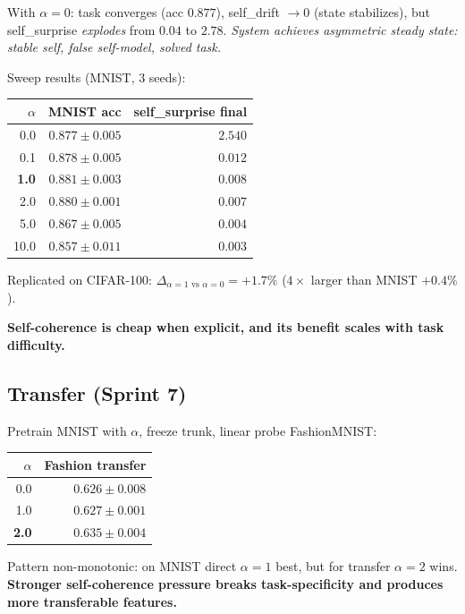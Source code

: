 \documentclass[11pt]{article}
\begin{document}
With $\alpha=0$: task converges (acc $0.877$), self\_drift $\to 0$ (state stabilizes), but self\_surprise \emph{explodes} from $0.04$ to $2.78$. \emph{System achieves asymmetric steady state: stable self, false self-model, solved task.}

Sweep results (MNIST, 3 seeds):

\begin{table}[h]
\centering\small
\begin{tabular}{rrr}
\toprule
$\alpha$ & MNIST acc & self\_surprise final \\
\midrule
0.0 & $0.877 \pm 0.005$ & $2.540$ \\
0.1 & $0.878 \pm 0.005$ & $0.012$ \\
\textbf{1.0} & $\mathbf{0.881 \pm 0.003}$ & $0.008$ \\
2.0 & $0.880 \pm 0.001$ & $0.007$ \\
5.0 & $0.867 \pm 0.005$ & $0.004$ \\
10.0 & $0.857 \pm 0.011$ & $0.003$ \\
\bottomrule
\end{tabular}
\end{table}

Replicated on CIFAR-100: $\Delta_{\alpha{=}1 \text{ vs } \alpha{=}0} = +1.7\%$ ($4\times$ larger than MNIST $+0.4\%$).

\textbf{Self-coherence is cheap when explicit, and its benefit scales with task difficulty.}

\subsection{Transfer (Sprint 7)}
Pretrain MNIST with $\alpha$, freeze trunk, linear probe FashionMNIST:

\begin{table}[h]
\centering\small
\begin{tabular}{rr}
\toprule
$\alpha$ & Fashion transfer \\
\midrule
0.0 & $0.626 \pm 0.008$ \\
1.0 & $0.627 \pm 0.001$ \\
\textbf{2.0} & $\mathbf{0.635 \pm 0.004}$ \\
\bottomrule
\end{tabular}
\end{table}

Pattern non-monotonic: on MNIST direct $\alpha=1$ best, but for transfer $\alpha=2$ wins. \textbf{Stronger self-coherence pressure breaks task-specificity and produces more transferable features.}
\end{document}
